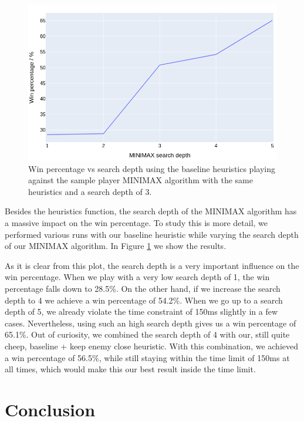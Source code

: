 \documentclass[aps,prd,notitlepage,floatfix,superscriptaddress,groupedaddress,nofootinbib]{revtex4-1}
\begin{document}
\begin{figure}[tbh!]
    \centering
    \includegraphics[width=0.8\linewidth]{plots/search_depth.png}
    \caption{Win percentage vs search depth using the baseline heuristics playing against the sample player MINIMAX algorithm with the same heuristics and a search depth of 3.}
    \label{fig:search_depth}
\end{figure}

Besides the heuristics function, the search depth of the MINIMAX algorithm has a massive impact on the win percentage. To study this is more detail, we performed various runs with our baseline heuristic while varying the search depth of our MINIMAX algorithm. In Figure \ref{fig:search_depth} we show the results.

As it is clear from this plot, the search depth is a very important influence on the win percentage. When we play with a very low search depth of 1, the win percentage falls down to 28.5\%. On the other hand, if we increase the search depth to 4 we achieve a win percentage of 54.2\%. When we go up to a search depth of 5, we already violate the time constraint of 150ms slightly in a few cases. Nevertheless, using such an high search depth gives us a win percentage of 65.1\%. Out of curiosity, we combined the search depth of 4 with our, still quite cheep, baseline + keep enemy close heuristic. With this combination, we achieved a win percentage of 56.5\%, while still staying within the time limit of 150ms at all times, which would make this our best result inside the time limit.

\section{Conclusion}
\end{document}
